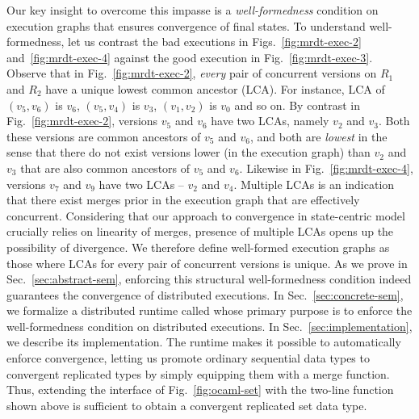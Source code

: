 Our key insight to overcome this impasse is a \emph{well-formedness}
condition on execution graphs that ensures convergence of final
states. To understand well-formedness, let us contrast the bad
executions in Figs.~\ref{fig:mrdt-exec-2} and~\ref{fig:mrdt-exec-4}
against the good execution in Fig.~\ref{fig:mrdt-exec-3}. Observe that
in Fig.~\ref{fig:mrdt-exec-2}, \emph{every} pair of concurrent
versions on $R_1$ and $R_2$ have a unique lowest common ancestor
(LCA). For instance, LCA of $(v_5,v_6)$ is $v_6$, $(v_5,v_4)$ is
$v_3$, $(v_1,v_2)$ is $v_0$ and so on. By contrast in
Fig.~\ref{fig:mrdt-exec-2}, versions $v_5$ and $v_6$ have two LCAs,
namely $v_2$ and $v_3$. Both these versions are common ancestors of
$v_5$ and $v_6$, and both are \emph{lowest} in the sense that there do
not exist versions lower (in the execution graph) than $v_2$ and $v_3$
that are also common ancestors of $v_5$ and $v_6$. Likewise in
Fig.~\ref{fig:mrdt-exec-4}, versions $v_7$ and $v_9$ have two LCAs --
$v_2$ and $v_4$. Multiple LCAs is an indication that there exist
merges prior in the execution graph that are effectively concurrent.
Considering that our approach to convergence in state-centric model
crucially relies on linearity of merges, presence of multiple LCAs
opens up the possibility of divergence. We therefore define
well-formed execution graphs as those where LCAs for every pair of
concurrent versions is unique. As we prove in
Sec.~\ref{sec:abstract-sem}, enforcing this structural
well-formedness condition indeed guarantees the convergence of
distributed executions. In Sec.~\ref{sec:concrete-sem}, we formalize a
distributed runtime called \quark whose primary purpose is to enforce
the well-formedness condition on distributed executions. In
Sec.~\ref{sec:implementation}, we describe its implementation. The
runtime makes it possible to automatically enforce convergence,
letting us promote ordinary sequential data types to convergent
replicated types by simply equipping them with a merge function.
Thus, extending the  interface of Fig.~\ref{fig:ocaml-set} with
the two-line  function shown above is sufficient to
obtain a convergent replicated set data type.
